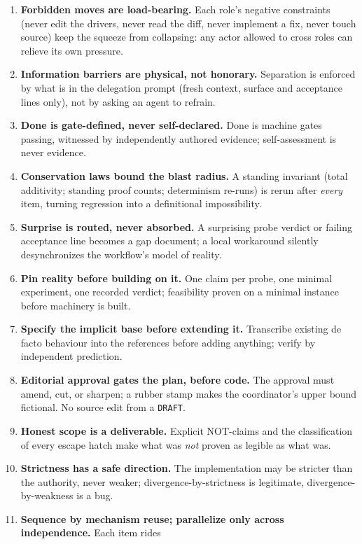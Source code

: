\documentclass[11pt]{article}
\newcommand{\code}[1]{\texttt{#1}}
\begin{document}
\begin{enumerate}
\item \textbf{Forbidden moves are load-bearing.} Each role's negative constraints (never edit the
  drivers, never read the diff, never implement a fix, never touch source) keep the squeeze from
  collapsing: any actor allowed to cross roles can relieve its own pressure.
\item \textbf{Information barriers are physical, not honorary.} Separation is enforced by what is in the
  delegation prompt (fresh context, surface and acceptance lines only), not by asking an agent to
  refrain.
\item \textbf{Done is gate-defined, never self-declared.} Done is machine gates passing, witnessed by
  independently authored evidence; self-assessment is never evidence.
\item \textbf{Conservation laws bound the blast radius.} A standing invariant (total additivity; standing
  proof counts; determinism re-runs) is rerun after \emph{every} item, turning regression into a
  definitional impossibility.
\item \textbf{Surprise is routed, never absorbed.} A surprising probe verdict or failing acceptance line
  becomes a gap document; a local workaround silently desynchronizes the workflow's model of reality.
\item \textbf{Pin reality before building on it.} One claim per probe, one minimal experiment, one
  recorded verdict; feasibility proven on a minimal instance before machinery is built.
\item \textbf{Specify the implicit base before extending it.} Transcribe existing de facto behaviour into
  the references before adding anything; verify by independent prediction.
\item \textbf{Editorial approval gates the plan, before code.} The approval must amend, cut, or sharpen;
  a rubber stamp makes the coordinator's upper bound fictional. No source edit from a \code{DRAFT}.
\item \textbf{Honest scope is a deliverable.} Explicit NOT-claims and the classification of every escape
  hatch make what was \emph{not} proven as legible as what was.
\item \textbf{Strictness has a safe direction.} The implementation may be stricter than the authority,
  never weaker; divergence-by-strictness is legitimate, divergence-by-weakness is a bug.
\item \textbf{Sequence by mechanism reuse; parallelize only across independence.} Each item rides

\end{enumerate}
\end{document}
